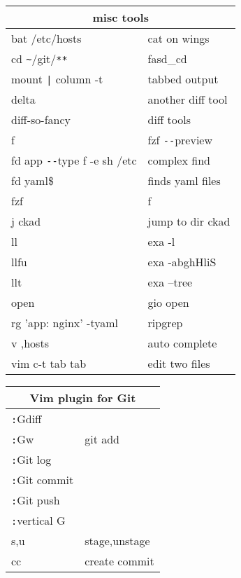 \documentclass[12pt,paper=landscape,paper=a4]{scrartcl}
\begin{document}
\begin{multicols}{3}
    \begin{tabular}{ll}
        \multicolumn{2}{c}{misc tools}\\
        \hline
        bat /etc/hosts              & cat on wings\\
        cd \verb!~!/git/\verb!**!   & fasd\_cd \\
        mount \verb!|! column -t    & tabbed output \\
        delta                       & another diff tool\\
        diff-so-fancy               & diff tools\\
        f                           & fzf \verb!--!preview\\
        fd app \verb!--!type f -e sh /etc & complex find \\
        fd yaml\$       & finds yaml files\\
        fzf             & f\\
        j ckad          & jump to dir ckad\\
        ll              & exa -l\\
        llfu            & exa -abghHliS\\
        llt             & exa --tree\\
        open            & gio open\\
        rg 'app: nginx' -tyaml      & ripgrep \\
        v ,hosts                    & auto complete\\
        vim c-t tab tab             & edit two files\\
    \end{tabular}

    \vspace{1em}

    \begin{tabular}{ll}
        \multicolumn{2}{c}{Vim plugin for Git}\\
        \hline
        \verb!:!Gdiff          & \\
        \verb!:!Gw             & git add\\
        \verb!:!Git log        & \\
        \verb!:!Git commit     & \\
        \verb!:!Git push       & \\
        \verb!:!vertical G     & \\
        s,u  	        & stage,unstage\\
        cc		        & create commit\\
    \end{tabular}


\end{multicols}
\end{document}
